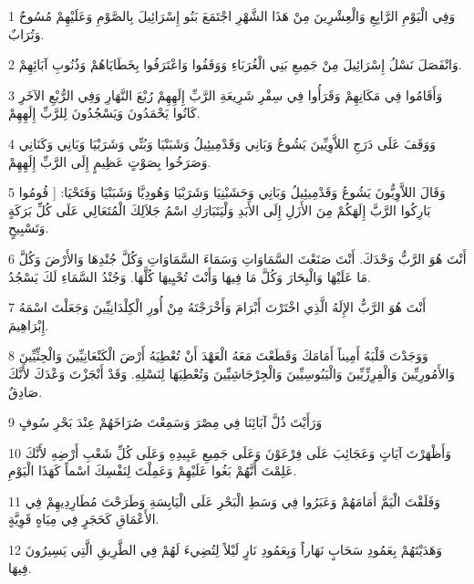 \par 1 وَفِي الْيَوْمِ الرَّابِعِ وَالْعِشْرِينَ مِنْ هَذَا الشَّهْرِ اجْتَمَعَ بَنُو إِسْرَائِيلَ بِالصَّوْمِ وَعَلَيْهِمْ مُسُوحٌ وَتُرَابٌ.
\par 2 وَانْفَصَلَ نَسْلُ إِسْرَائِيلَ مِنْ جَمِيعِ بَنِي الْغُرَبَاءِ وَوَقَفُوا وَاعْتَرَفُوا بِخَطَايَاهُمْ وَذُنُوبِ آبَائِهِمْ.
\par 3 وَأَقَامُوا فِي مَكَانِهِمْ وَقَرَأُوا فِي سِفْرِ شَرِيعَةِ الرَّبِّ إِلَهِهِمْ رُبْعَ النَّهَارِ وَفِي الرُّبْعِ الآخَرِ كَانُوا يَحْمَدُونَ وَيَسْجُدُونَ لِلرَّبِّ إِلَهِهِمْ.
\par 4 وَوَقَفَ عَلَى دَرَجِ اللاَّوِيِّينَ يَشُوعُ وَبَانِي وَقَدْمِيئِيلُ وَشَبَنْيَا وَبُنِّي وَشَرَبْيَا وَبَانِي وَكَنَانِي وَصَرَخُوا بِصَوْتٍ عَظِيمٍ إِلَى الرَّبِّ إِلَهِهِمْ.
\par 5 وَقَالَ اللاَّوِيُّونَ يَشُوعُ وَقَدْمِيئِيلُ وَبَانِي وَحَشَبْنِيَا وَشَرَبْيَا وَهُودِيَّا وَشَبَنْيَا وَفَتَحْيَا: [ قُومُوا بَارِكُوا الرَّبَّ إِلَهَكُمْ مِنَ الأَزَلِ إِلَى الأَبَدِ وَلْيَتَبَارَكِ اسْمُ جَلاَلِكَ الْمُتَعَالِي عَلَى كُلِّ بَرَكَةٍ وَتَسْبِيحٍ.
\par 6 أَنْتَ هُوَ الرَّبُّ وَحْدَكَ. أَنْتَ صَنَعْتَ السَّمَاوَاتِ وَسَمَاءَ السَّمَاوَاتِ وَكُلَّ جُنْدِهَا وَالأَرْضَ وَكُلَّ مَا عَلَيْهَا وَالْبِحَارَ وَكُلَّ مَا فِيهَا وَأَنْتَ تُحْيِيهَا كُلَّهَا. وَجُنْدُ السَّمَاءِ لَكَ يَسْجُدُ.
\par 7 أَنْتَ هُوَ الرَّبُّ الإِلَهُ الَّذِي اخْتَرْتَ أَبْرَامَ وَأَخْرَجْتَهُ مِنْ أُورِ الْكِلْدَانِيِّينَ وَجَعَلْتَ اسْمَهُ إِبْرَاهِيمَ.
\par 8 وَوَجَدْتَ قَلْبَهُ أَمِيناً أَمَامَكَ وَقَطَعْتَ مَعَهُ الْعَهْدَ أَنْ تُعْطِيَهُ أَرْضَ الْكَنْعَانِيِّينَ وَالْحِثِّيِّينَ وَالأَمُورِيِّينَ وَالْفِرِزِّيِّينَ وَالْيَبُوسِيِّينَ وَالْجِرْجَاشِيِّينَ وَتُعْطِيَهَا لِنَسْلِهِ. وَقَدْ أَنْجَزْتَ وَعْدَكَ لأَنَّكَ صَادِقٌ.
\par 9 وَرَأَيْتَ ذُلَّ آبَائِنَا فِي مِصْرَ وَسَمِعْتَ صُرَاخَهُمْ عِنْدَ بَحْرِ سُوفٍ
\par 10 وَأَظْهَرْتَ آيَاتٍ وَعَجَائِبَ عَلَى فِرْعَوْنَ وَعَلَى جَمِيعِ عَبِيدِهِ وَعَلَى كُلِّ شَعْبِ أَرْضِهِ لأَنَّكَ عَلِمْتَ أَنَّهُمْ بَغُوا عَلَيْهِمْ وَعَمِلْتَ لِنَفْسِكَ اسْماً كَهَذَا الْيَوْمِ.
\par 11 وَفَلَقْتَ الْيَمَّ أَمَامَهُمْ وَعَبَرُوا فِي وَسَطِ الْبَحْرِ عَلَى الْيَابِسَةِ وَطَرَحْتَ مُطَارِدِيهِمْ فِي الأَعْمَاقِ كَحَجَرٍ فِي مِيَاهٍ قَوِيَّةٍ.
\par 12 وَهَدَيْتَهُمْ بِعَمُودِ سَحَابٍ نَهَاراً وَبِعَمُودِ نَارٍ لَيْلاً لِتُضِيءَ لَهُمْ فِي الطَّرِيقِ الَّتِي يَسِيرُونَ فِيهَا.
